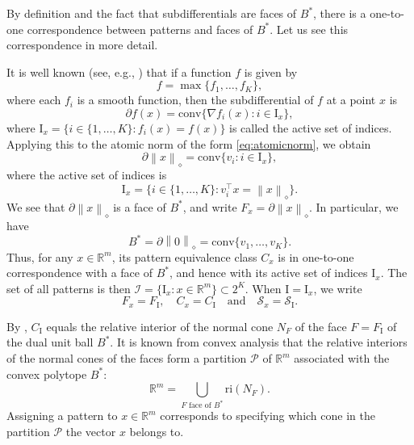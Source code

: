 \documentclass[12pt]{amsart}
\numberwithin{equation}{section}
\numberwithin{equation}{section}
\theoremstyle{definition}
\newcommand{\R}{\mathbb{R}}
\newcommand{\I}{\mathrm{I}}
\newcommand{\poly}[1]{\left\|#1\right\|_\diamond}
\newcommand{\polyd}[1]{\left\|#1\right\|^\ast_\diamond}
\renewcommand{\SS}{\mathcal{S}}
\begin{document}
By definition and the fact that subdifferentials are faces of $B^\ast$,
there is a one-to-one correspondence between patterns and faces of $B^\ast$. 
Let us see this correspondence in more detail. 



It is well known (see, e.g., \cite[Exercise 8.31]{Rockafellar}) that if a function $f$ is given by 
\[
f=\max\{f_1,\ldots,f_K\},
\]
where each $f_i$ is a smooth function, then the subdifferential of $f$ at a point $x$ is 
\[
\partial f(x) = \mathrm{conv}\{ \nabla f_i(x)\colon i\in\I_x\},
\]
where $\I_x = \{i\in\{1,\ldots,K\}\colon f_i(x)=f(x)\}$ is called the active set of indices. Applying this to the atomic norm
of the form \eqref{eq:atomicnorm}, we obtain
\[
 \partial\poly{x} = \mathrm{conv}\{v_i\colon i\in\I_x\}, 
\]
where the active set of indices is
\[
\I_x =\{ i\in\{1,\ldots,K\}\colon  v_i^\top x = \poly{x}\}. 
\]
We see that $\partial\poly{x}$ is a face of $B^\ast$, and write $F_x=\partial\poly{x}$.
In particular, we have 
\[
B^\ast=\partial\poly{0}= \mathrm{conv}\{v_1,\ldots,v_K\}. 
\]
Thus, for any $x\in \R^m$, 
its pattern equivalence class $C_x$ is in one-to-one correspondence with 
a face of $B^\ast$, and hence with its active set of indices $\I_x$.  
The set of all patterns is then $\mathcal{I} = \{ \I_x\colon x\in\R^m\}\subset 2^K$.
When $\I=\I_x$, we write 
\[
F_x=F_{\I},\quad C_x = C_{\I}\quad\mbox{and}\quad \SS_x = \SS_{\I}.
\]

By \cite[Theorem 3.2]{POLYNORMS}, $C_{\I}$ equals the relative interior of the normal cone $N_{F}$ of the face $F=F_{\I}$
of the dual unit ball $B^\ast$. 
It is known from convex analysis that the relative interiors of the normal cones of the faces form a partition ${\mathcal P}$ of $\R^m$ associated with the convex polytope $B^\ast$:
\[ 
\R^m=\bigcup_{F \mbox{ face of } B^\ast}\!\!\mathrm{ri}(N_{F}).  
\]
Assigning a pattern to $x\in \R^m$ corresponds to specifying which cone in the partition  ${\mathcal P}$ the vector $x$ belongs to.

\end{document}
